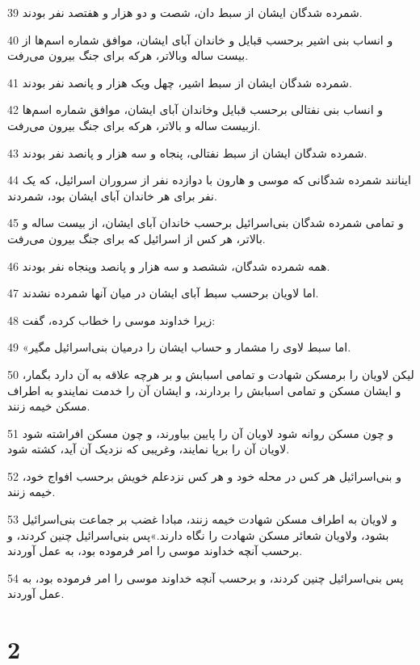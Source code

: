 \par 39 شمرده شدگان ایشان از سبط دان، شصت و دو هزار و هفتصد نفر بودند.
\par 40 و انساب بنی اشیر برحسب قبایل و خاندان آبای ایشان، موافق شماره اسم‌ها از بیست ساله وبالاتر، هر‌که برای جنگ بیرون می‌رفت.
\par 41 شمرده شدگان ایشان از سبط اشیر، چهل ویک هزار و پانصد نفر بودند.
\par 42 و انساب بنی نفتالی برحسب قبایل وخاندان آبای ایشان، موافق شماره اسم‌ها ازبیست ساله و بالاتر، هر‌که برای جنگ بیرون می‌رفت.
\par 43 شمرده شدگان ایشان از سبط نفتالی، پنجاه و سه هزار و پانصد نفر بودند.
\par 44 اینانند شمرده شدگانی که موسی و هارون با دوازده نفر از سروران اسرائیل، که یک نفر برای هر خاندان آبای ایشان بود، شمردند.
\par 45 و تمامی شمرده شدگان بنی‌اسرائیل برحسب خاندان آبای ایشان، از بیست ساله و بالاتر، هر کس از اسرائیل که برای جنگ بیرون می‌رفت.
\par 46 همه شمرده شدگان، ششصد و سه هزار و پانصد وپنجاه نفر بودند.
\par 47 اما لاویان برحسب سبط آبای ایشان در میان آنها شمرده نشدند.
\par 48 زیرا خداوند موسی را خطاب کرده، گفت:
\par 49 «اما سبط لاوی را مشمار و حساب ایشان را درمیان بنی‌اسرائیل مگیر.
\par 50 لیکن لاویان را برمسکن شهادت و تمامی اسبابش و بر هرچه علاقه به آن دارد بگمار، و ایشان مسکن و تمامی اسبابش را بردارند، و ایشان آن را خدمت نمایندو به اطراف مسکن خیمه زنند.
\par 51 و چون مسکن روانه شود لاویان آن را پایین بیاورند، و چون مسکن افراشته شود لاویان آن را برپا نمایند، وغریبی که نزدیک آن آید، کشته شود.
\par 52 و بنی‌اسرائیل هر کس در محله خود و هر کس نزدعلم خویش برحسب افواج خود، خیمه زنند.
\par 53 و لاویان به اطراف مسکن شهادت خیمه زنند، مبادا غضب بر جماعت بنی‌اسرائیل بشود، ولاویان شعائر مسکن شهادت را نگاه دارند.»پس بنی‌اسرائیل چنین کردند، و برحسب آنچه خداوند موسی را امر فرموده بود، به عمل آوردند.
\par 54 پس بنی‌اسرائیل چنین کردند، و برحسب آنچه خداوند موسی را امر فرموده بود، به عمل آوردند.
 
\chapter{2}

